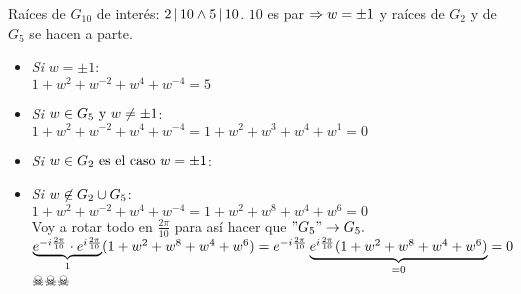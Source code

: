 \begin{enumerate}[label=\roman*)]
	      \separadorCorto
	      Raíces de $G_{10}$ de interés: $2 \, | \, 10 \land 5 \, | \, 10$. $10$ es par $\Rightarrow w = \pm1$ y
	      raíces de $G_2$ y de $G_5$ se hacen a parte.\\

	      \begin{minipage}{0.6\textwidth}
		      \begin{itemize}
			      \item \textit{Si} $w = \pm1$: \\
			            $1 + w^2 + w^{-2} + w^4 + w^{-4} = 5$ \Tilde\\

			      \item \textit{Si} $w \in G_5 \text{ y } w \neq \pm1$: \\
			            $1 + w^2 + w^{-2} + w^4 + w^{-4} = 1 + w^2 + w^3 + w^4 + w^1 = 0$\Tilde\\

			      \item
			            \textit{Si} $w \in G_2 \text{ es el caso } w = \pm 1$: \Tilde \\

			      \item
			            \textit{Si} $w\not\in G_2 \cup G_5$: \\
			            $1 + w^2 + w^{-2} + w^4 + w^{-4} = 1 + w^2 + w^8 + w^4 + w^6 = 0$ \Tilde\\
                        Voy a rotar todo en $\frac{2\pi}{10}$ para así hacer que $"G_5" \to G_5.$\\
                        $\underbrace{\textstyle e^{- i \frac{2\pi}{10}}\cdot e^{i \frac{2\pi}{10}}}_{1} (  1 + w^2 + w^8 + w^4 + w^6)=
                        e^{- i \frac{2\pi}{10}} \underbrace{\textstyle e^{i \frac{2\pi}{10}} (  1 + w^2 + w^8 + w^4 + w^6)}_{=0} = 0 $\\
			             $\skull \skull \skull$
		      \end{itemize}




\end{minipage}
\end{enumerate}
